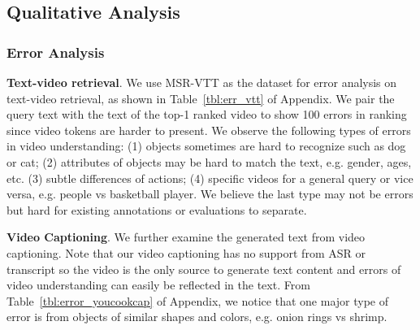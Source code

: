 \documentclass[11pt,a4paper]{article}
\begin{document}
\begin{table}[!htbp]
\centering
{}



\caption{Ablation study of VLM for video captioning on Youcook2 dataset.}
\label{tbl:abl_cap}
\end{table}





\subsection{Qualitative Analysis}
\subsubsection{Error Analysis} 
\noindent \textbf{Text-video retrieval}.
We use MSR-VTT as the dataset for error analysis on text-video retrieval, as shown in Table~\ref{tbl:err_vtt} of Appendix.
We pair the query text with the text of the top-1 ranked video to show 100 errors in ranking since video tokens are harder to present.
We observe the following types of errors in video understanding: (1) objects sometimes are hard to recognize such as dog or cat; (2) attributes of objects may be hard to match the text, e.g. gender, ages, etc. (3) subtle differences of actions;  (4) specific videos for a general query or vice versa, e.g. people vs basketball player. We believe the last type may not be errors but hard for existing annotations or evaluations to separate.

\noindent \textbf{Video Captioning}.
We further examine the generated text from video captioning.
Note that our video captioning has no support from ASR or transcript so the video is the only source to generate text content and errors of video understanding can easily be reflected in the text.
From Table~\ref{tbl:error_youcookcap} of Appendix, we notice that one major type of error is from objects of similar shapes and colors, e.g. onion rings vs shrimp.
\end{document}
